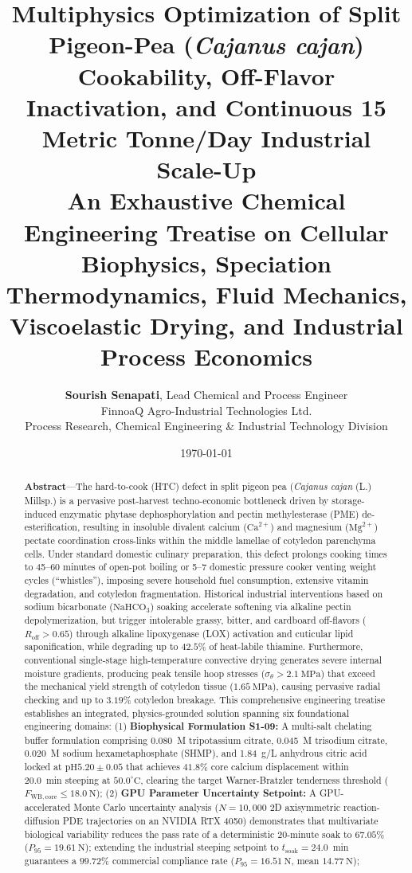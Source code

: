\documentclass[10pt,a4paper]{article}
\title{\textbf{\LARGE Multiphysics Optimization of Split Pigeon-Pea (\textit{Cajanus cajan}) Cookability, Off-Flavor Inactivation, and Continuous 15 Metric Tonne/Day Industrial Scale-Up}\\[0.4em]
\large An Exhaustive Chemical Engineering Treatise on Cellular Biophysics, Speciation Thermodynamics, Fluid Mechanics, Viscoelastic Drying, and Industrial Process Economics}
\author{\textbf{Sourish Senapati}, Lead Chemical and Process Engineer\\
FinnoaQ Agro-Industrial Technologies Ltd.\\
Process Research, Chemical Engineering \& Industrial Technology Division}
\date{\today}
\begin{document}
\maketitle
\thispagestyle{fancy}

\begin{abstract}
\noindent\textbf{Abstract}---The hard-to-cook (HTC) defect in split pigeon pea (\textit{Cajanus cajan} (L.) Millsp.) is a pervasive post-harvest techno-economic bottleneck driven by storage-induced enzymatic phytase dephosphorylation and pectin methylesterase (PME) de-esterification, resulting in insoluble divalent calcium ($\mathrm{Ca}^{2+}$) and magnesium ($\mathrm{Mg}^{2+}$) pectate coordination cross-links within the middle lamellae of cotyledon parenchyma cells. Under standard domestic culinary preparation, this defect prolongs cooking times to 45--60 minutes of open-pot boiling or 5--7 domestic pressure cooker venting weight cycles (``whistles''), imposing severe household fuel consumption, extensive vitamin degradation, and cotyledon fragmentation. Historical industrial interventions based on sodium bicarbonate ($\mathrm{NaHCO}_3$) soaking accelerate softening via alkaline pectin depolymerization, but trigger intolerable grassy, bitter, and cardboard off-flavors ($R_{\mathrm{off}} > 0.65$) through alkaline lipoxygenase (LOX) activation and cuticular lipid saponification, while degrading up to $42.5\%$ of heat-labile thiamine. Furthermore, conventional single-stage high-temperature convective drying generates severe internal moisture gradients, producing peak tensile hoop stresses ($\sigma_{\theta} > 2.1\ \mathrm{MPa}$) that exceed the mechanical yield strength of cotyledon tissue ($1.65\ \mathrm{MPa}$), causing pervasive radial checking and up to $3.19\%$ cotyledon breakage. This comprehensive engineering treatise establishes an integrated, physics-grounded solution spanning six foundational engineering domains:
(1) \textbf{Biophysical Formulation S1-09:} A multi-salt chelating buffer formulation comprising 0.080~M tripotassium citrate, 0.045~M trisodium citrate, 0.020~M sodium hexametaphosphate (SHMP), and 1.84~g/L anhydrous citric acid locked at $\mathrm{pH } 5.20 \pm 0.05$ that achieves $41.8\%$ core calcium displacement within 20.0~min steeping at $50.0^\circ\mathrm{C}$, clearing the target Warner-Bratzler tenderness threshold ($F_{\mathrm{WB,core}} \le 18.0\ \mathrm{N}$);
(2) \textbf{GPU Parameter Uncertainty Setpoint:} A GPU-accelerated Monte Carlo uncertainty analysis ($N = 10,000$ 2D axisymmetric reaction-diffusion PDE trajectories on an NVIDIA RTX 4050) demonstrates that multivariate biological variability reduces the pass rate of a deterministic 20-minute soak to $67.05\%$ ($P_{95} = 19.61\ \mathrm{N}$); extending the industrial steeping setpoint to $t_{\mathrm{soak}} = 24.0$~min guarantees a $99.72\%$ commercial compliance rate ($P_{95} = 16.51\ \mathrm{N}$, mean $14.77\ \mathrm{N}$);

\end{abstract}
\end{document}
